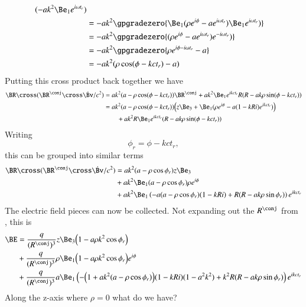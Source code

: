 {\begin{equation}
\begin{aligned}
(-a k^2 \Be_1 e^{i \omega t_r} )  \\
&=
- a k^2 \gpgradezero{
\Be_1 (\rho e^{i \phi} - a e^{i \omega t_r} )
\Be_1 e^{i \omega t_r} )
} \\
&=
- a k^2 \gpgradezero{
(\rho e^{i \phi} - a e^{i \omega t_r} )
e^{-i \omega t_r} )
} \\
&=
- a k^2 \gpgradezero{
\rho e^{i \phi - i \omega t_r} - a
} \\
&=
- a k^2 ( \rho \cos(\phi - k c t_r) - a )
\end{aligned}
\end{equation}
%
Putting this cross product back together we have
%
\begin{equation}\label{eqn:relativisticElectrodynamicsExamReflection:1150}
\begin{aligned}
\BR \cross (\BR^\conj \cross \dot{\Bv}/c^2)
&=
a k^2 ( a -\rho \cos(\phi - k c t_r) ) \BR^\conj
+a k^2 \Be_1 e^{i k c  t_r} R(R - a k \rho \sin(\phi - k c t_r)) \\
&=
a k^2 ( a -\rho \cos(\phi - k c t_r) ) \Bigl(
z \Be_3 + \Be_1 (\rho e^{i \phi} - a (1 - k R i) e^{i k c t_r} )
\Bigr) \\
&\qquad +a k^2 R \Be_1 e^{i k c  t_r} (R - a k \rho \sin(\phi - k c t_r))
\end{aligned}
\end{equation}
%
Writing
%
\begin{equation}\label{eqn:relativisticElectrodynamicsExamReflection:640}
\phi_r = \phi - k c t_r,
\end{equation}
%
this can be grouped into similar terms
%
\begin{equation}\label{eqn:relativisticElectrodynamicsExamReflection:660}
\begin{aligned}
\BR \cross (\BR^\conj \cross \dot{\Bv}/c^2)
&=
a k^2
(a - \rho \cos\phi_r) z \Be_3 \\
&+
a k^2
\Be_1
(a - \rho \cos\phi_r) \rho e^{i\phi} \\
&+
a k^2
\Be_1
\left(
-a (a - \rho \cos\phi_r) (1 - k R i)
+ R(R - a k \rho \sin \phi_r)
\right) e^{i k c t_r}
\end{aligned}
\end{equation}
%
The electric field pieces can now be collected.  Not expanding out the \(R^\conj\) from , this is
%
\begin{equation}\label{eqn:relativisticElectrodynamicsExamReflection:700}
\begin{aligned}
\BE &=
\frac{q}{(R^\conj)^3} z \Be_3
\Bigl( 1 - a \rho k^2 \cos\phi_r \Bigr) \\
&+
\frac{q}{(R^\conj)^3} \rho
\Be_1 \Bigl(1 - a \rho k^2 \cos\phi_r \Bigr) e^{i\phi} \\
&+
\frac{q}{(R^\conj)^3} a \Be_1
\left(
-\Bigl( 1 + a k^2 (a - \rho \cos\phi_r) \Bigr) (1 - k R i)(1 - a^2 k^2)
+ k^2 R(R - a k \rho \sin \phi_r)
\right) e^{i k c t_r}
\end{aligned}
\end{equation}
%
Along the z-axis where \(\rho = 0\) what do we have?

}
